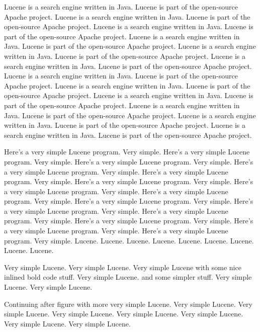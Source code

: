 \documentclass[11pt]{book}
\begin{document}
Lucene is a search engine written in Java.  Lucene is part of the
open-source Apache project.
Lucene is a search engine written in Java.  Lucene is part of the
open-source Apache project.
Lucene is a search engine written in Java.  Lucene is part of the
open-source Apache project.
Lucene is a search engine written in Java.  Lucene is part of the
open-source Apache project.
Lucene is a search engine written in Java.  Lucene is part of the
open-source Apache project.
Lucene is a search engine written in Java.  Lucene is part of the
open-source Apache project.
Lucene is a search engine written in Java.  Lucene is part of the
open-source Apache project.
Lucene is a search engine written in Java.  Lucene is part of the
open-source Apache project.
Lucene is a search engine written in Java.  Lucene is part of the
open-source Apache project.
Lucene is a search engine written in Java.  Lucene is part of the
open-source Apache project.
Lucene is a search engine written in Java.  Lucene is part of the
open-source Apache project.
Lucene is a search engine written in Java.  Lucene is part of the
open-source Apache project.
%


\noindent
Here's a very simple Lucene program.  Very simple.
Here's a very simple Lucene program.  Very simple.
Here's a very simple Lucene program.  Very simple.
Here's a very simple Lucene program.  Very simple.
Here's a very simple Lucene program.  Very simple.
Here's a very simple Lucene program.  Very simple.
Here's a very simple Lucene program.  Very simple.
Here's a very simple Lucene program.  Very simple.
Here's a very simple Lucene program.  Very simple.
Here's a very simple Lucene program.  Very simple.
Here's a very simple Lucene program.  Very simple.
Here's a very simple Lucene program.  Very simple.
Here's a very simple Lucene program.  Very simple.
Here's a very simple Lucene program.  Very simple.
Lucene.
Lucene.
Lucene.
Lucene.
Lucene.
Lucene.
Lucene.
Lucene.
Lucene.

Very simple Lucene.
Very simple Lucene.
Very simple Lucene with some nice inlined
bold code
 stuff.
Very simple Lucene.
and some simpler  stuff.
Very simple Lucene.
Very simple Lucene.

%

\noindent
Continuing after figure with more very simple Lucene.
Very simple Lucene.
Very simple Lucene.
Very simple Lucene.
Very simple Lucene.
Very simple Lucene.
Very simple Lucene.
Very simple Lucene.
\end{document}
